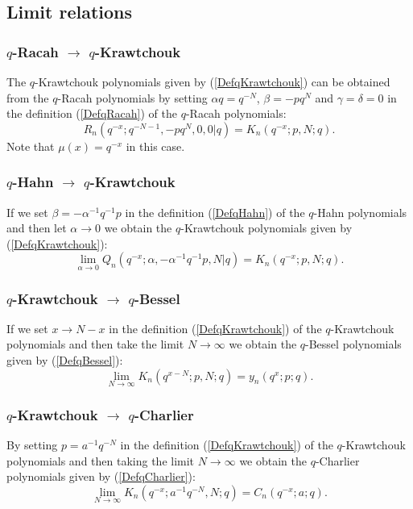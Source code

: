 \documentclass[envcountchap,graybox]{svmono}
\newcounter{rom}
\begin{document}
\subsection*{Limit relations}

\subsubsection*{$q$-Racah $\rightarrow$ $q$-Krawtchouk}
The $q$-Krawtchouk polynomials given by (\ref{DefqKrawtchouk}) can be obtained from
the $q$-Racah polynomials by setting $\alpha q=q^{-N}$, $\beta=-pq^N$ and
$\gamma=\delta=0$ in the definition (\ref{DefqRacah}) of the $q$-Racah polynomials:
$$R_n(q^{-x};q^{-N-1},-pq^N,0,0|q)=K_n(q^{-x};p,N;q).$$
Note that $\mu(x)=q^{-x}$ in this case.

\subsubsection*{$q$-Hahn $\rightarrow$ $q$-Krawtchouk}
If we set $\beta=-\alpha^{-1}q^{-1}p$ in the definition (\ref{DefqHahn}) of the $q$-Hahn polynomials
and then let $\alpha\rightarrow 0$ we obtain the $q$-Krawtchouk polynomials given by
(\ref{DefqKrawtchouk}):
$$\lim_{\alpha\rightarrow 0}
Q_n(q^{-x};\alpha,-\alpha^{-1}q^{-1}p,N|q)=K_n(q^{-x};p,N;q).$$

\subsubsection*{$q$-Krawtchouk $\rightarrow$ $q$-Bessel}
If we set $x\rightarrow N-x$ in the definition (\ref{DefqKrawtchouk}) of the
$q$-Krawtchouk polynomials and then take the limit $N\rightarrow\infty$ we
obtain the $q$-Bessel polynomials given by (\ref{DefqBessel}):
\begin{equation}
\lim_{N\rightarrow\infty}K_n(q^{x-N};p,N;q)=y_n(q^x;p;q).
\end{equation}

\subsubsection*{$q$-Krawtchouk $\rightarrow$ $q$-Charlier}
By setting $p=a^{-1}q^{-N}$ in the definition (\ref{DefqKrawtchouk}) of the
$q$-Krawtchouk polynomials and then taking the limit $N\rightarrow\infty$ we
obtain the $q$-Charlier polynomials given by (\ref{DefqCharlier}):
\begin{equation}
\lim_{N\rightarrow\infty}K_n(q^{-x};a^{-1}q^{-N},N;q)=C_n(q^{-x};a;q).
\end{equation}
\end{document}
